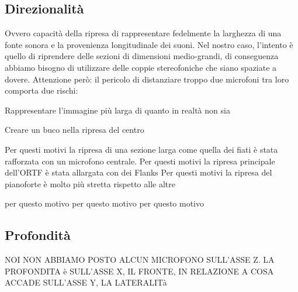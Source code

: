 \subsection{Direzionalità}
Ovvero capacità della ripresa di rappresentare fedelmente la larghezza di una fonte sonora e la provenienza longitudinale dei suoni. Nel nostro caso, l'intento è quello di riprendere delle sezioni di dimensioni medio-grandi, di conseguenza abbiamo bisogno di utilizzare delle coppie stereofoniche che siano spaziate  a dovere. Attenzione però: il pericolo di distanziare troppo due microfoni tra loro comporta due rischi:
\begin{compactitem}
	\item Rappresentare l'immagine più larga di quanto in realtà non sia
	\item Creare un buco nella ripresa del centro
\end{compactitem}
Per questi motivi la ripresa di una sezione larga come quella dei fiati è stata rafforzata con un microfono centrale.
Per questi motivi la ripresa principale dell'ORTF è stata allargata con dei Flanks
Per questi motivi la ripresa del pianoforte è molto più stretta rispetto alle altre

per questo motivo per questo motivo per questo motivo

\subsection*{Profondità}

NOI NON ABBIAMO POSTO ALCUN MICROFONO SULL'ASSE Z. LA PROFONDITA è SULL'ASSE X, IL FRONTE, IN RELAZIONE A COSA ACCADE SULL'ASSE Y, LA LATERALITà

